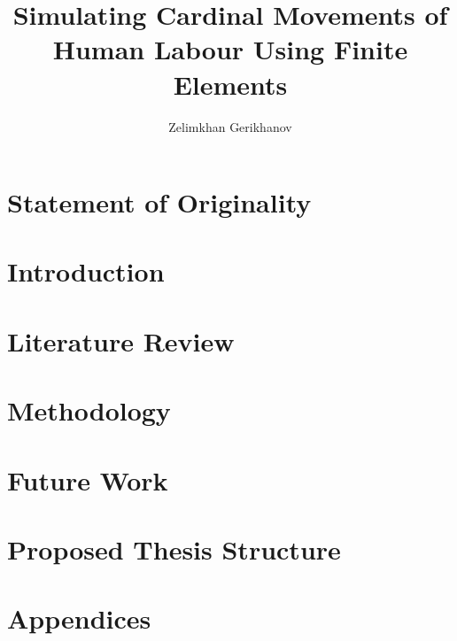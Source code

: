 \documentclass[oneside,12pt]{CUEDthesisPSnPDF}
\title{Simulating Cardinal Movements of Human Labour Using Finite Elements}
\author{Zelimkhan Gerikhanov}
\begin{document}
\maketitle

\listoffixmes
{}
\tableofcontents
\listoffigures
\listoftables


\chapter*{Statement of Originality}

\clearpage
{}

\chapter{Introduction}\label{chap-introduction}


\chapter{Literature Review}\label{chap-literature}


\chapter{Methodology}\label{chap-methodology}


\chapter{Future Work}\label{chap-future}


\chapter{Proposed Thesis Structure}\label{chap-thesis}



%


\chapter{Appendices}


\end{document}
